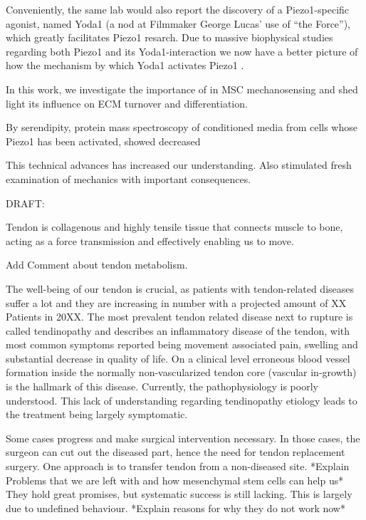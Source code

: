 Conveniently, the same lab would also report the discovery of a Piezo1-specific agonist, named Yoda1 (a nod at Filmmaker George Lucas’ use of “the Force”), which greatly facilitates Piezo1 resarch. \cite{Syeda2015} Due to massive biophysical studies regarding both Piezo1 \cite{Saotome2018} and its Yoda1-interaction \cite{Lacroix2018} we now have a better picture of how the mechanism by which Yoda1 activates Piezo1 \cite{Botello-Smith2019}.

In this work, we investigate the importance of \Piezo{} in MSC mechanosensing and shed light its influence on ECM turnover and differentiation. 

By serendipity, protein mass spectroscopy of conditioned media from cells whose Piezo1 has been activated, showed decreased 


This technical advances has increased our understanding. Also stimulated fresh examination of mechanics with important consequences.

DRAFT: 

Tendon is collagenous and highly tensile tissue that connects muscle to bone, acting as a force transmission and effectively enabling us to move. 

Add Comment about tendon metabolism. 

The well-being of our tendon is crucial, as patients with tendon-related diseases suffer a lot and they are increasing in number with a projected amount of XX Patients in 20XX. The most prevalent tendon related disease next to rupture is called tendinopathy and describes an inflammatory disease of the tendon, with most common symptoms reported being movement associated pain, swelling and substantial decrease in quality of life. On a clinical level erroneous blood vessel formation inside the normally non-vascularized tendon core (vascular in-growth) is the hallmark of this disease. Currently, the pathophysiology is poorly understood. This lack of understanding regarding tendinopathy etiology leads to the treatment being largely symptomatic. 

Some cases progress and make surgical intervention necessary. In those cases, the surgeon can cut out the diseased part, hence the need for tendon replacement surgery.  One approach is to transfer tendon from a non-diseased site. *Explain Problems that we are left with and how mesenchymal stem cells can help us* They hold great promises, but systematic success is still lacking. This is largely due to undefined behaviour. *Explain reasons for why they do not work now* 

